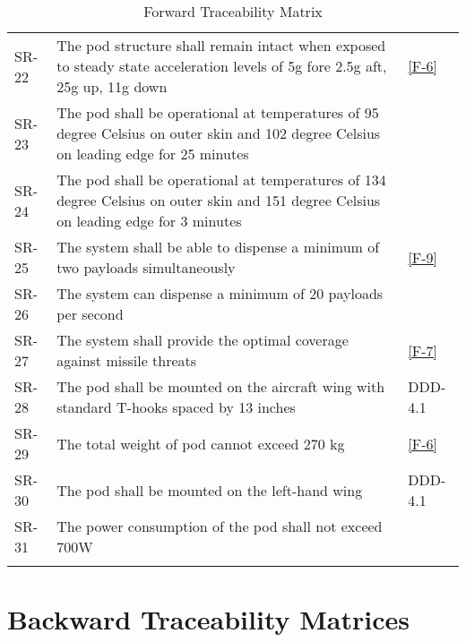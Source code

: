 \documentclass[Main]{subfiles}
\begin{document}
\begin{longtable}{p{} p{} p{}}
SR-22 &  The pod structure shall remain intact when exposed to steady state acceleration levels of 5g fore 2.5g aft, 25g up, 11g down & \ref{F-6} \\

SR-23 &  The pod shall be operational at temperatures of 95 degree Celsius on outer skin and 102 degree Celsius on leading edge for 25 minutes &  \\

SR-24 &  The pod shall be operational at temperatures of 134 degree Celsius on outer skin and 151 degree Celsius on leading edge for 3 minutes &  \\

SR-25 & The system shall be able to dispense a minimum of two payloads simultaneously  & \ref{F-9} \\

SR-26 & The system can dispense a minimum of 20 payloads per second &  \\

SR-27 & The system shall provide the optimal coverage against	missile threats & \ref{F-7} \\

SR-28 & The pod shall be mounted on the aircraft wing with standard T-hooks spaced by 13 inches & DDD-4.1 \\

SR-29 & The total weight of pod cannot exceed 270 kg  & \ref{F-6} \\

SR-30 & The pod shall be mounted on the left-hand wing & DDD-4.1 \\

SR-31 & The power consumption of the pod shall not exceed 700W &  \\\hline

\caption{Forward Traceability Matrix}
\label{Tab:Forward}
\end{longtable}






\newpage
\section{Backward Traceability Matrices}\label{sec:BackTrace}
\end{document}
